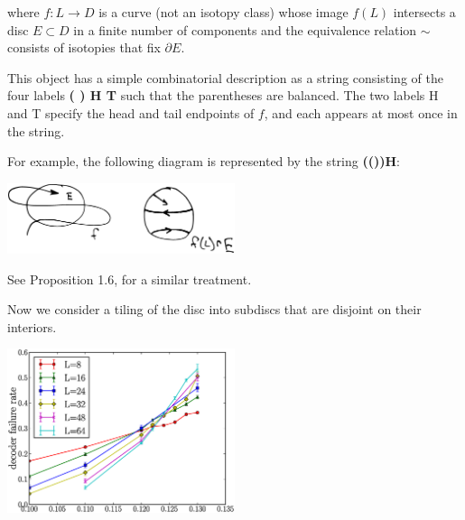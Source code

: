 \documentclass[12pt,a4paper]{article}
\begin{document}
where $f:L\to D$ is a curve (not an isotopy class)
whose image $f(L)$ intersects a disc $E\subset D$ in a finite number of components
and the equivalence relation $\sim$ consists of isotopies that fix $\partial E.$

This object has a simple combinatorial description 
as a string consisting of
the four labels {\bf ( ) H T} such that 
the parentheses are balanced. The two labels H and T specify the
head and tail endpoints of $f$, and each appears at most once in the string.

For example, the following diagram is represented by
the string {\bf(())H}:

\begin{center}
\includegraphics[width=0.5\textwidth]{planar.eps}
\end{center}

See \cite{Abramsky08} Proposition 1.6, for a similar treatment.



Now we consider a tiling of the disc into subdiscs that are disjoint on
their interiors.







\begin{center}
\includegraphics[width=0.5\textwidth]{threshold-graph.eps}
\end{center}
\end{document}

